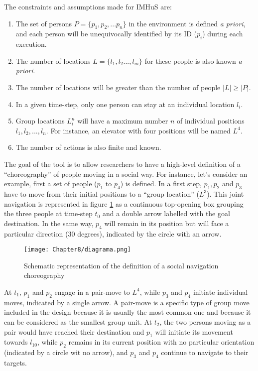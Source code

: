 The constraints and assumptions made for IMHuS are:
\begin{enumerate}
    \item The set of persons $P=\{p_1, p_2, ... p_n\}$ in the environment is defined {\em a priori}, and each person will be unequivocally identified by its ID ($p_i$) during each execution.
    \item The number of locations $L=\{l_1, l_2...,l_m\}$ for these people is also known {\em a priori}.
    \item The number of locations will be greater than the number of people $|L| \geq |P|$.
    \item In a given time-step, only one person can stay at an individual location $l_i$.
    \item Group locations $L^n_i$ will have a maximum number $n$ of individual positions $l_1, l_2, ..., l_n$. For instance, an elevator with four positions will be named $L^4$.
    \item The number of actions is also finite and known.
\end{enumerate}

The goal of the tool is to allow researchers to have a high-level definition of a ``choreography'' of people moving in a social way. For instance, let's consider an example, first a set of people ($p_1$ to $p_4$) is defined. In a first step, $p_1, p_2$ and $p_3$ have to move from their initial positions to a ``group  location'' ($L^3$). This joint navigation is represented in figure \ref{fig:diagram} as a continuous top-opening box grouping the three people at time-step $t_0$ and a double arrow labelled with the goal destination. In the same way, $p_4$ will remain in its position but will face a particular direction (30 degrees), indicated by the circle with an arrow. 

 \begin{figure}[h!]%
    \centering
    \texttt{[image: Chapter8/diagrama.png]}
    \caption{Schematic representation of the definition of a social navigation choreography}
    \label{fig:diagram}
\end{figure}

At $t_1$, $p_1$ and $p_2$ engage in a pair-move to $L^4$, while $p_3$ and $p_4$ initiate individual moves, indicated by a single arrow. A pair-move is a specific type of group move included in the design because it is usually the most common one and because it can be considered as the smallest group unit. At $t_2$, the two persons moving as a pair would have reached their destination and $p_1$ will initiate its movement towards $l_{10}$, while $p_2$ remains in its current position with no particular orientation (indicated by a circle wit no arrow), and $p_3$ and $p_4$ continue to navigate to their targets.

